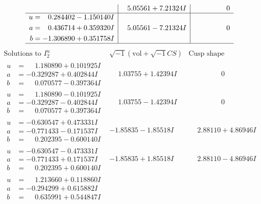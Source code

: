 \documentclass[1p]{elsarticle_modified}
\theoremstyle{definition}
\newcommand{\I}{\sqrt{-1}}
\begin{document}
$$\begin{array}{c|c|c}
 & \phantom{-}5.05561 + 7.21324 I & \phantom{-0.000000 } 0 \\ \hline\begin{aligned}
u &= \phantom{-}0.284402 - 1.150140 I \\
a &= \phantom{-}0.436714 + 0.359320 I \\
b &= -1.306890 + 0.351758 I\end{aligned}
 & \phantom{-}5.05561 - 7.21324 I & \phantom{-0.000000 } 0\\
 \hline 
 \end{array}$$\newpage$$\begin{array}{c|c|c}  
\text{Solutions to }I^u_{2}& \I (\text{vol} + \sqrt{-1}CS) & \text{Cusp shape}\\
 \hline 
\begin{aligned}
u &= \phantom{-}1.180890 + 0.101925 I \\
a &= -0.329287 + 0.402844 I \\
b &= \phantom{-}0.070577 - 0.397364 I\end{aligned}
 & \phantom{-}1.03755 + 1.42394 I & \phantom{-0.000000 } 0 \\ \hline\begin{aligned}
u &= \phantom{-}1.180890 - 0.101925 I \\
a &= -0.329287 - 0.402844 I \\
b &= \phantom{-}0.070577 + 0.397364 I\end{aligned}
 & \phantom{-}1.03755 - 1.42394 I & \phantom{-0.000000 } 0 \\ \hline\begin{aligned}
u &= -0.630547 + 0.473331 I \\
a &= -0.771433 - 0.171537 I \\
b &= \phantom{-}0.202395 - 0.600140 I\end{aligned}
 & -1.85835 - 1.85518 I & \phantom{-}2.88110 + 4.86946 I \\ \hline\begin{aligned}
u &= -0.630547 - 0.473331 I \\
a &= -0.771433 + 0.171537 I \\
b &= \phantom{-}0.202395 + 0.600140 I\end{aligned}
 & -1.85835 + 1.85518 I & \phantom{-}2.88110 - 4.86946 I \\ \hline\begin{aligned}
u &= \phantom{-}1.213660 + 0.118860 I \\
a &= -0.294299 + 0.615882 I \\
b &= \phantom{-}0.635991 + 0.544847 I\end{aligned}

\end{array}$$
\end{document}
